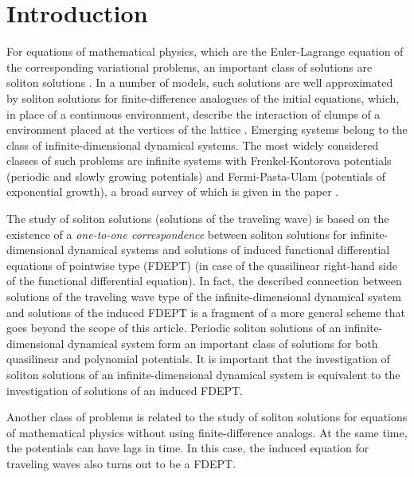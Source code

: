 \documentclass[
11pt,%
tightenlines,%
twoside,%
onecolumn,%
nofloats,%
nobibnotes,%
nofootinbib,%
superscriptaddress,%
noshowpacs,%
centertags,aps]%
{revtex4}
\begin{document}
\maketitle


\section{Introduction}
For equations of mathematical physics, which are the Euler-Lagrange equation of the corresponding variational problems, an important class of solutions are soliton solutions \cite{Toda.1989,Miwa.2000}. In a number of models, such solutions are well approximated by soliton solutions for finite-difference analogues of the initial equations, which, in place of a continuous environment, describe the interaction of clumps of a environment placed at the vertices of the lattice \cite{Toda.1989,Frenkel.1938}. Emerging systems belong to the class of infinite-dimensional dynamical systems. The most widely considered classes of such problems are infinite systems with Frenkel-Kontorova potentials (periodic and slowly growing potentials) and Fermi-Pasta-Ulam (potentials of exponential growth), a broad survey of which is given in the paper \cite{Pustyl'nikov.1997}.

The study of soliton solutions (solutions of the traveling wave) is based on the existence of a \textit{one-to-one correspondence} between soliton solutions for infinite-dimensional dynamical systems and solutions of induced functional differential equations of pointwise type (FDEPT) \cite{Beklaryan.2007} (in case of the quasilinear right-hand side of the functional differential equation). In fact, the described connection between solutions of the traveling wave type of the infinite-dimensional dynamical system and solutions of the induced FDEPT is a fragment of a more general scheme that goes beyond the scope of this article. Periodic soliton solutions of an infinite-dimensional dynamical system form an important class of solutions for both quasilinear and polynomial potentials. It is important that the investigation of soliton solutions of an infinite-dimensional dynamical system is equivalent to the investigation of solutions of an induced FDEPT.

Another class of problems is related to the study of soliton solutions for equations of mathematical physics without using finite-difference analogs. At the same time, the potentials can have lags in time. In this case, the induced equation for traveling waves also turns out to be a FDEPT.
\end{document}

